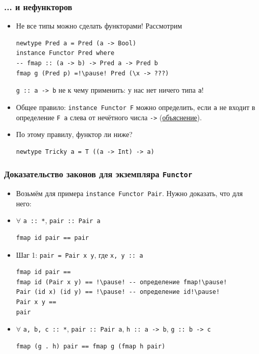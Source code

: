 \documentclass[11pt]{beamer}
\begin{document}
\begin{frame}[fragile]
  \frametitle{... и нефункторов}
  \begin{itemize}
    \item Не все типы можно сделать функторами! Рассмотрим
          \begin{lstlisting}
newtype Pred a = Pred (a -> Bool)
instance Functor Pred where 
-- fmap :: (a -> b) -> Pred a -> Pred b
fmap g (Pred p) =!\pause! Pred (\x -> ???)
\end{lstlisting}
          \pause \lstinline|g :: a -> b| не к чему применить: у нас нет ничего типа \lstinline|a|!
          \pause
    \item Общее правило: \lstinline|instance Functor F| можно определить, если \lstinline|a| не входит в определение \lstinline|F a| слева от нечётного числа \lstinline|->| (\href{https://downloads.haskell.org/~ghc/8.6.3/docs/html/users_guide/glasgow_exts.html#deriving-functor-instances}{объяснение}).
          \pause
    \item По этому правилу, функтор ли ниже?
          \begin{lstlisting}
newtype Tricky a = T ((a -> Int) -> a)
\end{lstlisting}
  \end{itemize}
\end{frame}

\begin{frame}[fragile]
  \frametitle{Доказательство законов для экземпляра \lstinline|Functor|}
  \begin{itemize}
    \item Возьмём для примера \lstinline|instance Functor Pair|. Нужно доказать, что для него:
    \item $\forall$ \lstinline|a :: *|, \lstinline|pair :: Pair a|
          \begin{lstlisting}
fmap id pair == pair
\end{lstlisting}
          \pause
    \item Шаг 1: \lstinline|pair = Pair x y|, где \lstinline|x, y :: |\pause\lstinline|a|
          \begin{lstlisting}
fmap id pair ==
fmap id (Pair x y) == !\pause! -- определение fmap!\pause!
Pair (id x) (id y) == !\pause! -- определение id!\pause!
Pair x y == 
pair
\end{lstlisting}
          \pause
    \item $\forall$ \lstinline|a, b, c :: *|, \lstinline|pair :: Pair a|, \lstinline|h :: a -> b|, \lstinline|g :: b -> c|
          \begin{lstlisting}
fmap (g . h) pair == fmap g (fmap h pair)
\end{lstlisting}
  \end{itemize}
\end{frame}
\end{document}
